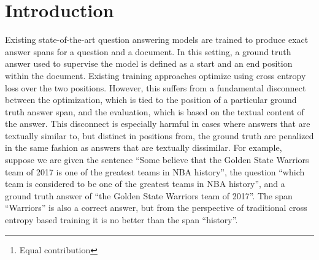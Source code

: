 \documentclass{article} \usepackage{iclr2018_conference,times}
\title{\papertitle}
\author{Caiming Xiong\footnotemark[1], Victor Zhong\thanks{Equal contribution}, Richard Socher  \\
Salesforce Research \\
Palo Alto, CA 94301, USA \\
\texttt{\{cxiong, vzhong, rsocher\}@salesforce.com} \\
}
\newcommand{\emours}{75.1\%\xspace}
\newcommand{\fours}{83.1\%\xspace}
\newcommand{\emoursensemble}{78.9\%\xspace}
\newcommand{\foursensemble}{86.0\%\xspace}
\begin{document}
\maketitle

\begin{abstract}
Traditional models for question answering optimize using cross entropy loss, which encourages exact answers at the cost of penalizing nearby or overlapping answers that are sometimes equally accurate.
We propose a mixed objective that combines cross entropy loss with self-critical policy learning. The objective uses rewards derived from word overlap to solve the misalignment between evaluation metric and optimization objective.
In addition to the mixed objective, we improve dynamic coattention networks (DCN) with a deep residual coattention encoder that is inspired by recent work in deep self-attention and residual networks.
Our proposals improve model performance across question types and input lengths, especially for long questions that requires the ability to capture long-term dependencies.
On the Stanford Question Answering Dataset, our model achieves state-of-the-art results with~\emours exact match accuracy and~\fours F1, while the ensemble obtains~\emoursensemble exact match accuracy and~\foursensemble F1.
\end{abstract}




\section{Introduction}



Existing state-of-the-art question answering models are trained to produce exact answer spans for a question and a document.
In this setting, a ground truth answer used to supervise the model is defined as a start and an end position within the document.
Existing training approaches optimize using cross entropy loss over the two positions.
However, this suffers from a fundamental disconnect between the optimization, which is tied to the position of a particular ground truth answer span, and the evaluation, which is based on the textual content of the answer.
This disconnect is especially harmful in cases where answers that are textually similar to, but distinct in positions from, the ground truth are penalized in the same fashion as answers that are textually dissimilar.
For example, suppose we are given the sentence ``Some believe that the Golden State Warriors team of 2017 is one of the greatest teams in NBA history'', the question ``which team is considered to be one of the greatest teams in NBA history'', and a ground truth answer of ``the Golden State Warriors team of 2017''.
The span ``Warriors'' is also a correct answer, but from the perspective of traditional cross entropy based training it is no better than the span ``history''.
\end{document}
